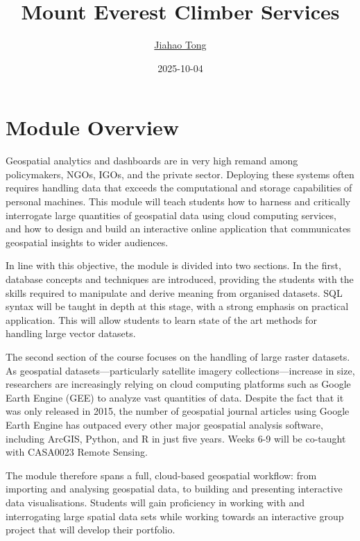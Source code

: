 \documentclass[
  letterpaper,
  DIV=11,
  numbers=noendperiod]{scrreprt}
\title{Mount Everest Climber Services}
\author{\href{https://tommytong21.github.io/casa0025groupwork/}{Jiahao
Tong}}
\date{2025-10-04}
\renewcommand*\contentsname{Table of contents}
\newcommand\contentsname{Table of contents}
\begin{document}
\maketitle

\renewcommand*\contentsname{Table of contents}
{
\hypersetup{linkcolor=}
\setcounter{tocdepth}{2}
\tableofcontents
}


\chapter*{Module Overview}\label{module-overview}


Geospatial analytics and dashboards are in very high remand among
policymakers, NGOs, IGOs, and the private sector. Deploying these
systems often requires handling data that exceeds the computational and
storage capabilities of personal machines. This module will teach
students how to harness and critically interrogate large quantities of
geospatial data using cloud computing services, and how to design and
build an interactive online application that communicates geospatial
insights to wider audiences.

In line with this objective, the module is divided into two sections. In
the first, database concepts and techniques are introduced, providing
the students with the skills required to manipulate and derive meaning
from organised datasets. SQL syntax will be taught in depth at this
stage, with a strong emphasis on practical application. This will allow
students to learn state of the art methods for handling large vector
datasets.

The second section of the course focuses on the handling of large raster
datasets. As geospatial datasets---particularly satellite imagery
collections---increase in size, researchers are increasingly relying on
cloud computing platforms such as Google Earth Engine (GEE) to analyze
vast quantities of data. Despite the fact that it was only released in
2015, the number of geospatial journal articles using Google Earth
Engine has outpaced every other major geospatial analysis software,
including ArcGIS, Python, and R in just five years. Weeks 6-9 will be
co-taught with CASA0023 Remote Sensing.

The module therefore spans a full, cloud-based geospatial workflow: from
importing and analysing geospatial data, to building and presenting
interactive data visualisations. Students will gain proficiency in
working with and interrogating large spatial data sets while working
towards an interactive group project that will develop their portfolio.
\end{document}
